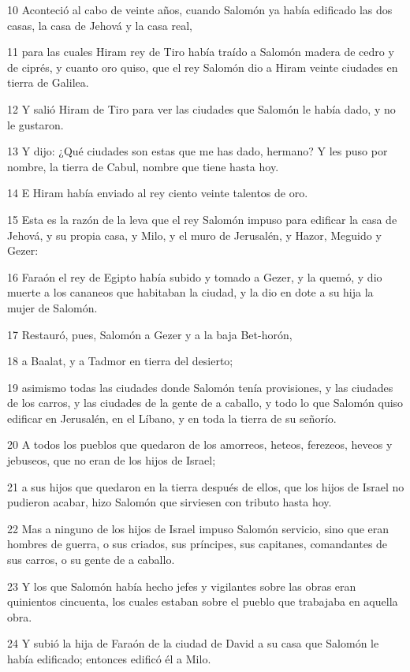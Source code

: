 \par 10 Aconteció al cabo de veinte años, cuando Salomón ya había edificado las dos casas, la casa de Jehová y la casa real,
\par 11 para las cuales Hiram rey de Tiro había traído a Salomón madera de cedro y de ciprés, y cuanto oro quiso, que el rey Salomón dio a Hiram veinte ciudades en tierra de Galilea.
\par 12 Y salió Hiram de Tiro para ver las ciudades que Salomón le había dado, y no le gustaron.
\par 13 Y dijo: ¿Qué ciudades son estas que me has dado, hermano? Y les puso por nombre, la tierra de Cabul, nombre que tiene hasta hoy.
\par 14 E Hiram había enviado al rey ciento veinte talentos   de oro.
\par 15 Esta es la razón de la leva que el rey Salomón impuso para edificar la casa de Jehová, y su propia casa, y Milo, y el muro de Jerusalén, y Hazor, Meguido y Gezer:
\par 16 Faraón el rey de Egipto había subido y tomado a Gezer, y la quemó, y dio muerte a los cananeos que habitaban la ciudad, y la dio en dote a su hija la mujer de Salomón.
\par 17 Restauró, pues, Salomón a Gezer y a la baja Bet-horón,
\par 18 a Baalat, y a Tadmor en tierra del desierto;
\par 19 asimismo todas las ciudades donde Salomón tenía provisiones, y las ciudades de los carros, y las ciudades de la gente de a caballo, y todo lo que Salomón quiso edificar en Jerusalén, en el Líbano, y en toda la tierra de su señorío.
\par 20 A todos los pueblos que quedaron de los amorreos, heteos, ferezeos, heveos y jebuseos, que no eran de los hijos de Israel;
\par 21 a sus hijos que quedaron en la tierra después de ellos, que los hijos de Israel no pudieron acabar, hizo Salomón que sirviesen con tributo hasta hoy.
\par 22 Mas a ninguno de los hijos de Israel impuso Salomón servicio, sino que eran hombres de guerra, o sus criados, sus príncipes, sus capitanes, comandantes de sus carros, o su gente de a caballo.
\par 23 Y los que Salomón había hecho jefes y vigilantes sobre las obras eran quinientos cincuenta, los cuales estaban sobre el pueblo que trabajaba en aquella obra.
\par 24 Y subió la hija de Faraón de la ciudad de David a su casa que Salomón le había edificado; entonces edificó él a Milo.
